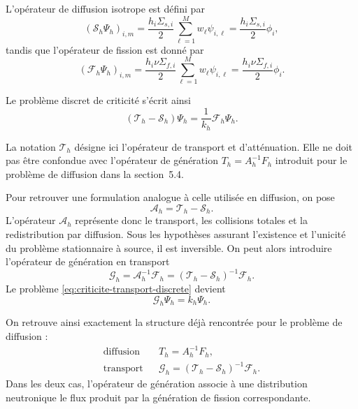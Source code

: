 \documentclass{article}
\begin{document}
L'opérateur de diffusion isotrope est défini par
\begin{equation}
    \left(\mathcal S_h\Psi_h \right)_{i,m} 
    = \frac{h_i\Sigma_{s,i}}{2} \sum_{\ell=1}^{M} w_\ell\psi_{i,\ell}
    = \frac{h_i\Sigma_{s,i}}{2}\phi_i,
    \label{eq:operateur-scattering-discret}
\end{equation}
tandis que l'opérateur de fission est donné par
\begin{equation}
    \left( \mathcal F_h\Psi_h \right)_{i,m}
    = \frac{h_i\nu\Sigma_{f,i}}{2} \sum_{\ell=1}^{M} w_\ell\psi_{i,\ell}
    = \frac{h_i\nu\Sigma_{f,i}}{2}\phi_i.
    \label{eq:operateur-fission-transport}
\end{equation}

Le problème discret de criticité s'écrit ainsi
\begin{equation}
    \boxed{\left( \mathcal T_h-\mathcal S_h \right)\Psi_h = \frac{1}{k_h}\mathcal F_h\Psi_h.}
    \label{eq:criticite-transport-discrete}
\end{equation}

La notation $\mathcal T_h$ désigne ici l'opérateur de transport et
d'atténuation. Elle ne doit pas être confondue avec l'opérateur de
génération $T_h=A_h^{-1}F_h$ introduit pour le problème de diffusion
dans la section~5.4.

Pour retrouver une formulation analogue à celle utilisée en diffusion,
on pose
\[
\mathcal A_h = \mathcal T_h-\mathcal S_h.
\]
L'opérateur $\mathcal A_h$ représente donc le transport, les collisions
totales et la redistribution par diffusion. Sous les hypothèses
assurant l'existence et l'unicité du problème stationnaire à source, il
est inversible. On peut alors introduire l'opérateur de génération en
transport
\begin{equation}
    \boxed{
        \mathcal G_h = \mathcal A_h^{-1}\mathcal F_h
        = \left( \mathcal T_h-\mathcal S_h \right)^{-1} \mathcal F_h.
    }
    \label{eq:operateur-generation-transport}
\end{equation}
Le problème \eqref{eq:criticite-transport-discrete} devient
\begin{equation}
    \mathcal G_h\Psi_h=k_h\Psi_h.
    \label{eq:probleme-propre-transport}
\end{equation}

On retrouve ainsi exactement la structure déjà rencontrée pour le
problème de diffusion :
\[
    \begin{array}{ccc}
        \text{diffusion}
        &&
        T_h=A_h^{-1}F_h,
        \\[0.2cm]
        \text{transport}
        &&
        \mathcal G_h = (\mathcal T_h-\mathcal S_h)^{-1}\mathcal F_h.
    \end{array}
\]
Dans les deux cas, l'opérateur de génération associe à une distribution neutronique le flux produit par la génération de fission correspondante.
\end{document}
